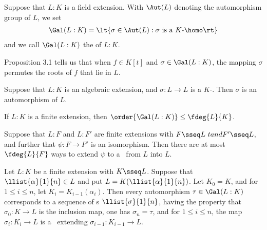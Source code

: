 \documentclass{article}
\begin{document}
  \begin{tdefinition}
    Suppose that \( L:K \) is a field extension.
    With \( \Aut(L) \) denoting the automorphism group of \( L \), we set \begin{align*}
      \Gal(L:K) = \lt\{ \sigma\in \Aut(L) : \sigma \text{ is a \( K \)-\homo} \rt\}
    \end{align*}
    and we call \( \Gal(L:K) \) the  of \( L:K \).
  \end{tdefinition}

  \quad Proposition 3.1 tells us that when \( f\in K[t] \) and \( \sigma\in \Gal(L:K) \), the mapping \( \sigma \) permutes the roots of \( f \) that lie in \( L \).

  \begin{ttheorem}
    Suppose that \( L:K \) is an algebraic extension, and \( \sigma:L\to L \) is a \( K \)-\homo.
    Then \( \sigma \) is an automorphism of \( L \).
  \end{ttheorem}

  \begin{ttheorem}
    If \( L:K \) is a finite extension, then \( \order{\Gal(L:K)}\leq \fdeg{L}{K} \).
  \end{ttheorem}

  \begin{tcorollary}
    Suppose that \( L:F \) and \( L:F' \) are finite extensions with \( F\sseq L\ tand F'\sseq L \), and further that \( \psi:F\to F' \) is an isomorphism.
    Then there are at most \( \fdeg{L}{F} \) ways to extend \( \psi \) to a \homo~from \( L \) into \( L \).
  \end{tcorollary}

  \begin{tcorollary}
    Let \( L:K \) be a finite extension with \( K\sseq L \).
    Suppose that \( \llist{\alpha}{1}{n}\in L \) and put \( L=K(\llist{\alpha}{1}{n}) \).
    Let \( K_0 = K \), and for \( 1\leq i\leq n \), let \( K_i = K_{i-1}(\alpha_i) \).
    Then every automorphism \( \tau \in \Gal(L:K) \) corresponds to a sequence of \homo s \( \llist{\sigma}{1}{n} \), having the property that \( \sigma_0:K\to L \) is the inclusion map, one has \( \sigma_n=\tau \), and for \( 1\leq i\leq n \), the map \( \sigma_i : K_i\to L \) is a \homo~extending \( \sigma_{i-1}:K_{i-1}\to L \).
  \end{tcorollary}
\end{document}
